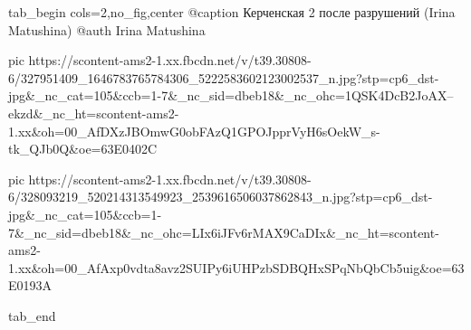  
 
 
 
 


\ifcmt
  tab_begin cols=2,no_fig,center
     @caption Керченская 2 после разрушений (Irina Matushina)
     @auth Irina Matushina

     pic https://scontent-ams2-1.xx.fbcdn.net/v/t39.30808-6/327951409_1646783765784306_5222583602123002537_n.jpg?stp=cp6_dst-jpg&_nc_cat=105&ccb=1-7&_nc_sid=dbeb18&_nc_ohc=1QSK4DcB2JoAX--ekzd&_nc_ht=scontent-ams2-1.xx&oh=00_AfDXzJBOmwG0obFAzQ1GPOJpprVyH6sOekW_s-tk_QJb0Q&oe=63E0402C

     pic https://scontent-ams2-1.xx.fbcdn.net/v/t39.30808-6/328093219_520214313549923_2539616506037862843_n.jpg?stp=cp6_dst-jpg&_nc_cat=105&ccb=1-7&_nc_sid=dbeb18&_nc_ohc=LIx6iJFv6rMAX9CaDIx&_nc_ht=scontent-ams2-1.xx&oh=00_AfAxp0vdta8avz2SUIPy6iUHPzbSDBQHxSPqNbQbCb5uig&oe=63E0193A

  tab_end
\fi
